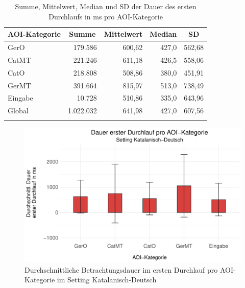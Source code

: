 \begin{table}
    \begin{tabular}{lrrrr}  
    \lsptoprule
        {AOI-Kategorie} & \multicolumn{1}{c}{Summe} & \multicolumn{1}{c}{Mittelwert} & \multicolumn{1}{c}{Median} & \multicolumn{1}{c}{SD} \\
        \midrule
        GerO   & 179.586 & 600,62 & 427,0 & 562,68 \\ 
        CatMT   & 221.246 & 611,18 & 426,5 & 558,06 \\ 
        CatO 	& 218.808 & 508,86 & 380,0 & 451,91 \\ 
        GerMT	& 391.664 & 815,97 & 513,0 & 738,49\\ 
        Eingabe   & 10.728 & 510,86 & 335,0 & 643,96 \\ 
        \midrule
        Global  & 1.022.032 & 641,98 & 427,0 & 607,56\\ 
        \lspbottomrule
    \end{tabular}
        \caption[Summe, Mittelwert, Median und SD der Dauer des ersten Durchlaufs]{Summe, Mittelwert, Median und SD der Dauer des ersten Durchlaufs in ms pro AOI-Kategorie\label{K6:tab:CatDe:mean-sd-iafrd}}
\end{table}



\begin{figure}
    \includegraphics[width=\textwidth]{Figures/EyeTracking/CatDe/ggplot_catde_meanfrundwell_AOI_de}
	\caption{Durchschnittliche Betrachtungsdauer im ersten Durchlauf pro AOI-Kategorie im Setting Katalanisch-Deutsch}
	\label{K6:fig:CatDe:mean-error-FRDwell}
\end{figure}

